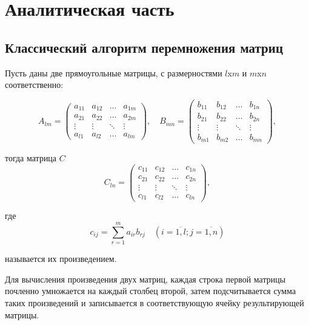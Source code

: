 \chapter{Аналитическая часть}

\section{Классический алгоритм перемножения матриц}

Пусть даны две прямоугольные матрицы, с размерностями $l$x$m$ и $m$x$n$ соответственно:

\begin{equation}
	A_{lm} = \begin{pmatrix}
		a_{11} & a_{12} & \ldots & a_{1m}\\
		a_{21} & a_{22} & \ldots & a_{2m}\\
		\vdots & \vdots & \ddots & \vdots\\
		a_{l1} & a_{l2} & \ldots & a_{lm}
	\end{pmatrix},
	\quad
		B_{mn} = \begin{pmatrix}
		b_{11} & b_{12} & \ldots & b_{1n}\\
		b_{21} & b_{22} & \ldots & b_{2n}\\
		\vdots & \vdots & \ddots & \vdots\\
		b_{m1} & b_{m2} & \ldots & b_{mn}
	\end{pmatrix},
\end{equation}

тогда матрица $C$
\begin{equation}
	C_{ln} = \begin{pmatrix}
		c_{11} & c_{12} & \ldots & c_{1n}\\
		c_{21} & c_{22} & \ldots & c_{2n}\\
		\vdots & \vdots & \ddots & \vdots\\
		c_{l1} & c_{l2} & \ldots & c_{ln}
	\end{pmatrix},
\end{equation}

где
\begin{equation}
	\label{eq:M}
	c_{ij} =
		\sum_{r=1}^{m} a_{ir}b_{rj} \quad (i=\overline{1,l}; j=\overline{1,n})
\end{equation}

называется их произведением\cite{optimize}.

Для вычисления произведения двух матриц, каждая строка первой матрицы почленно умножается
на каждый столбец второй, затем подсчитывается сумма таких произведений и записывается в
соответствующую ячейку результирующей матрицы.

